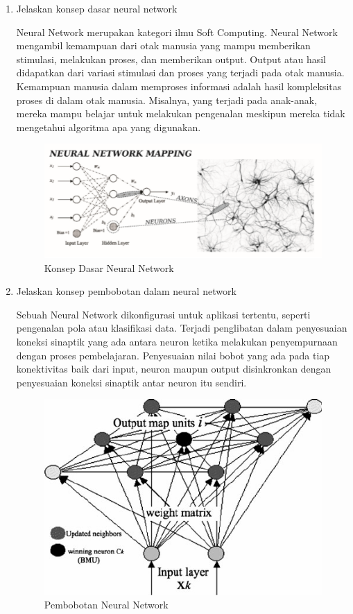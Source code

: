 \begin{enumerate}
\item Jelaskan konsep dasar neural network
\par Neural Network merupakan kategori ilmu Soft Computing. Neural Network mengambil kemampuan dari otak manusia yang mampu memberikan stimulasi, melakukan proses, dan memberikan output. Output atau hasil didapatkan dari variasi stimulasi dan proses yang terjadi pada otak manusia. Kemampuan manusia dalam memproses informasi adalah hasil kompleksitas proses di dalam otak manusia. Misalnya, yang terjadi pada anak-anak, mereka mampu belajar untuk melakukan pengenalan meskipun mereka tidak mengetahui algoritma apa yang digunakan. 
\begin{figure}[H]
\centering
\includegraphics[scale=0.5]{figures/1174057/chapter6/2.PNG}
\caption{Konsep Dasar Neural Network}
\label{Konsep Dasar Neural Network}
\end{figure}

\item Jelaskan konsep pembobotan dalam neural network

\par Sebuah Neural Network dikonﬁgurasi untuk aplikasi tertentu, seperti pengenalan pola atau klasiﬁkasi data. Terjadi penglibatan dalam penyesuaian koneksi sinaptik yang ada antara neuron ketika melakukan penyempurnaan dengan proses pembelajaran. Penyesuaian nilai bobot yang ada pada tiap konektivitas baik dari input, neuron maupun output disinkronkan dengan penyesuaian koneksi sinaptik antar neuron itu sendiri. 
\begin{figure}[H]
\centering
\includegraphics[scale=0.4]{figures/1174057/chapter6/3.png}
\caption{Pembobotan Neural Network}
\label{Pembobotan Neural Network}
\end{figure}		


\end{enumerate}
